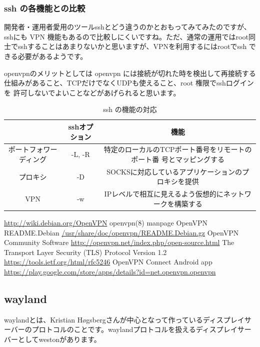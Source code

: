 \documentclass[mingoth,a4paper]{jsarticle}
\begin{document}
\subsubsection{ssh の各機能との比較}

開発者・運用者愛用のツールsshとどう違うのかとおもってみてみたのですが、
sshにも VPN 機能もあるので比較しにくいですね。ただ、通常の運用ではroot同
士でsshすることはあまりないかと思いますが、VPNを利用するにはrootでssh で
きる必要があるようです。

openvpnのメリットとしては openvpn には接続が切れた時を検出して再接続する
仕組みがあること、TCPだけでなくUDPも使えること、root 権限でsshログインを
許可しないでよいことなどがあげられると思います。

\begin{table}[H]
 \caption{ssh の機能の対応}
 \begin{tabular}{|c|c|c|}
 \hline
 \hline
 & sshオプション & 機能 \\
 \hline
 ポートフォワーディング &  -L, -R & 特定のローカルのTCPポート番号をリモートのポート番
	 号とマッピングする \\
 \hline
 プロキシ & -D & SOCKSに対応しているアプリケーションのプロキシを提供 \\
 \hline
 VPN & -w & IPレベルで相互に見えるよう仮想的にネットワークを構築する \\
 \hline
 \hline
 \end{tabular}
\end{table}


\begin{thebibliography}{0}
  \url{http://wiki.debian.org/OpenVPN}
  openvpn(8) manpage
  OpenVPN README.Debian \url{/usr/share/doc/openvpn/README.Debian.gz}
  OpenVPN Community Software
	 \url{http://openvpn.net/index.php/open-source.html}
	 The Transport Layer Security (TLS) Protocol
	 Version 1.2
	 \url{https://tools.ietf.org/html/rfc5246}
 OpenVPN Connect Android app
	\url{https://play.google.com/store/apps/details?id=net.openvpn.openvpn}
\end{thebibliography}


\subsection{wayland}
 waylandとは、Kristian H\o{}gsbergさんが中心となって作っているディスプレイサーバーのプロトコルのことです。waylandプロトコルを扱えるディスプレイサーバーとしてwestonがあります。
\end{document}
